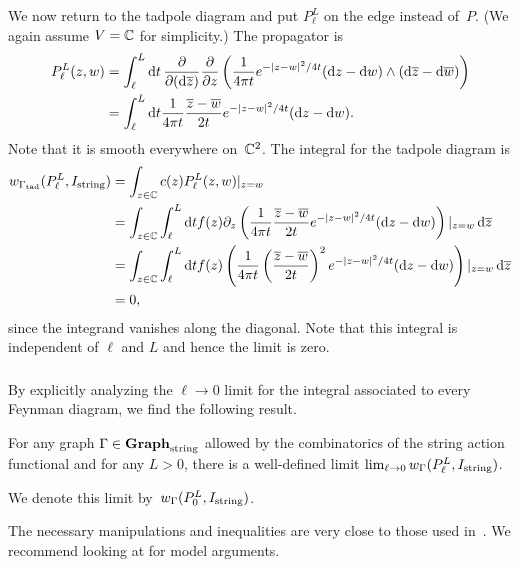 We now return to the tadpole diagram and put $P_\ell^L$ on the edge instead of~$P$.
(We again assume $V = \mathbb C$ for simplicity.)
The propagator is
\begin{align}\label{propagator}
P_\ell^L(z,w) &= \int_{\ell}^L {\rm d} t \, \frac{\partial}{\partial ({\rm d} \overline{z})} \frac{\partial}{\partial z}\left( \frac{1}{4\pi t} e^{-|z-w|^2/4t} ({\rm d} z - {\rm d} w) \wedge ({\rm d}\overline{z} - {\rm d}\overline{w})\right)\\
&= \int_{\ell}^L {\rm d} t \frac{1}{4\pi t} \frac{\overline{z} - \overline{w}}{2t} e^{-|z-w|^2/4t} ({\rm d} z - {\rm d} w).
\end{align}
Note that it is smooth everywhere on~$\mathbb C^2$.
The integral for the tadpole diagram is 
\begin{align*}
w_{\Gamma_{\rm tad}}(P_\ell^L,I_{\rm string})
&= \int_{z \in \mathbb C} c(z)P_\ell^L(z,w)|_{z = w}  \\
&= \int_{z \in \mathbb C} \int_{\ell}^L {\rm d} t f(z) \partial_z \left(\frac{1}{4\pi t} \frac{\overline{z} - \overline{w}}{2t} e^{-|z-w|^2/4t} ({\rm d} z - {\rm d} w) \right)|_{z = w}\, {\rm d} \overline{z}\\
&= \int_{z \in \mathbb C} \int_{\ell}^L {\rm d} t f(z) \left(\frac{1}{4\pi t} \left(\frac{\overline{z} - \overline{w}}{2t}\right)^2 e^{-|z-w|^2/4t} ({\rm d} z - {\rm d} w) \right)|_{z = w}\, {\rm d} \overline{z}\\
&= 0,
\end{align*}
since the integrand vanishes along the diagonal.
Note that this integral is independent of $\ell$ and $L$ and hence the limit is zero.

\subsubsection{}

By explicitly analyzing the $\ell \to 0$ limit for the integral associated to every Feynman diagram,
we find the following result.

\begin{prop}
For any graph $\Gamma \in {\bf Graph}_{\rm string}$ allowed by the combinatorics of the string action functional and for any $L > 0$,
there is a well-defined limit $\lim_{\ell \to 0} w_{\Gamma}(P_{\ell}^L,I_{\rm string})$.
\end{prop}

We denote this limit by~$w_{\Gamma}(P_{0}^L,I_{\rm string})$.

The necessary manipulations and inequalities are very close to those used in~\cite{}.
We recommend looking at  for model arguments.

